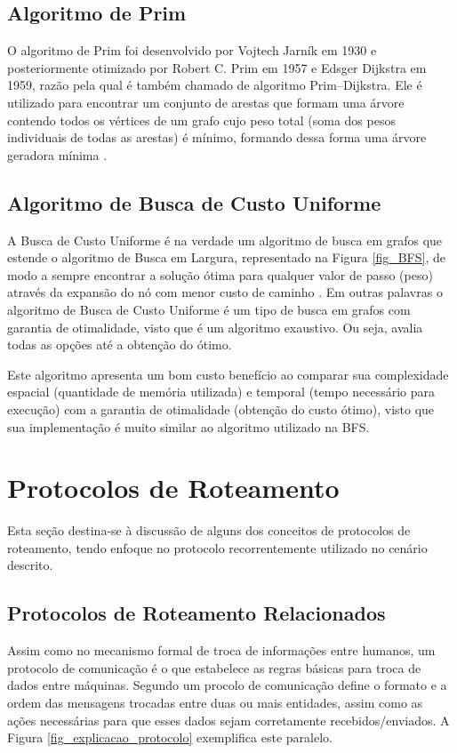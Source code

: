 \subsection{Algoritmo de Prim} 
\label{subsection-algoritmo-prim}
O algoritmo de Prim foi desenvolvido por  Vojtech Jarník em 1930 e posteriormente otimizado por Robert C. Prim em 1957 e Edsger Dijkstra em 1959, razão pela qual é também chamado de algoritmo Prim–Dijkstra. Ele é utilizado para encontrar um conjunto de arestas que formam uma árvore contendo todos os vértices de um grafo cujo peso total (soma dos pesos individuais de todas as arestas) é mínimo, formando dessa forma uma árvore geradora mínima \cite{Prim1957}.

\subsection{Algoritmo de Busca de Custo Uniforme}

A Busca de Custo Uniforme é na verdade um algoritmo de busca em grafos que estende o algoritmo de Busca em Largura, representado na Figura \ref{fig_BFS}, de modo a sempre encontrar a solução ótima para qualquer valor de passo (peso) através da expansão do nó com menor custo de caminho \cite{Book-Russell2018}. Em outras palavras o algoritmo de Busca de Custo Uniforme é um tipo de busca em grafos com garantia de otimalidade, visto que é um algoritmo exaustivo. Ou seja, avalia todas as opções até a obtenção do ótimo.

Este algoritmo apresenta um bom custo benefício ao comparar sua complexidade espacial (quantidade de memória utilizada) e temporal (tempo necessário para execução) com a garantia de otimalidade (obtenção do custo ótimo), visto que sua implementação é muito similar ao algoritmo utilizado na BFS.

\section{Protocolos de Roteamento}
\label{cap_protocolos_de_roteamento}
Esta seção destina-se à discussão de alguns dos conceitos de protocolos de roteamento, tendo enfoque no protocolo recorrentemente utilizado no cenário descrito.

\subsection{Protocolos de Roteamento Relacionados}%
Assim como no mecanismo formal de troca de informações entre humanos, um protocolo de comunicação é o que estabelece as regras básicas para troca de dados entre máquinas. Segundo \cite{Book-Kurose2013} um procolo de comunicação define o formato e a ordem das mensagens trocadas entre duas ou mais entidades, assim como as ações necessárias para que esses dados sejam corretamente recebidos/enviados. A Figura \ref{fig_explicacao_protocolo} exemplifica este paralelo.


